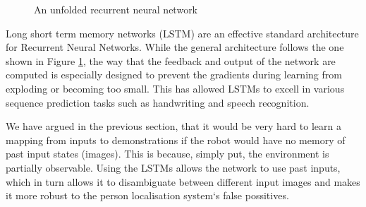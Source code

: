 \documentclass[a4paper,11pt]{report}
\begin{document}
\begin{figure}[h!]
\caption{An unfolded recurrent neural network}
\label{fig:RNN}
\end{figure}
  
Long short term memory networks (LSTM) \cite{hochreiter1997long} are an effective standard architecture for Recurrent Neural Networks. While the general architecture follows the one shown in Figure \ref{fig:RNN}, the way that the feedback and output of the network are computed is especially designed to prevent the gradients during learning from exploding or becoming too small. This has allowed LSTMs to excell in various sequence prediction tasks such as handwriting and speech recognition. 

We have argued in the previous section, that it would be very hard to learn a mapping from inputs to demonstrations if the robot would have no memory of past input states (images). This is because, simply put, the environment is partially observable. Using the LSTMs allows the network to use past inputs, which in turn allows it to disambiguate between different input images and makes it more robust to the person localisation system`s false possitives. 
\end{document}
